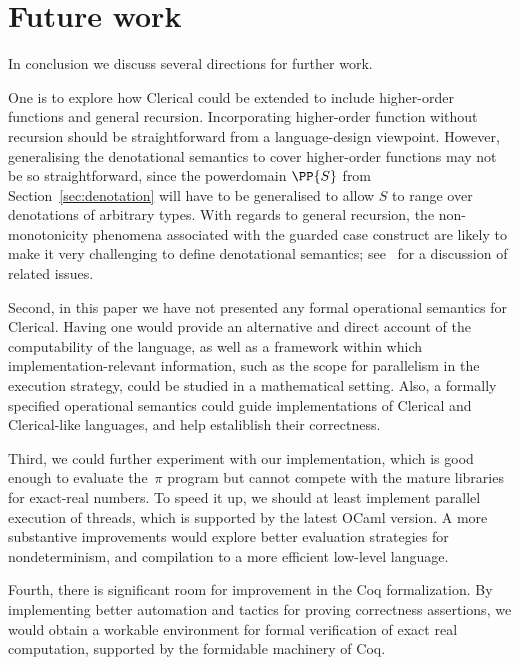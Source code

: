 \section{Future work}
\label{sec:future-work}

In conclusion we discuss several directions for further work.

One is to explore how Clerical could be extended to include higher-order functions and general recursion.
%
Incorporating higher-order function without recursion should be straightforward from a language-design viewpoint. However, generalising the denotational semantics to cover higher-order functions may not be so straightforward, since the powerdomain $\PP{S}$ from 
Section~\ref{sec:denotation} will have to be generalised to allow $S$ to range over denotations of arbitrary types. 
%
With regards to general recursion, the non-monotonicity phenomena associated with the guarded case construct are likely to make it very challenging to define denotational semantics; see~\cite{LEVY2007221} for a discussion of related issues.

Second, in this paper we have not presented any formal operational semantics for Clerical.
Having one would provide an alternative and direct
account of the computability of the language, as well as a
framework within which implementation-relevant information, such as
the scope for parallelism in the execution strategy, could be studied in a mathematical setting. Also, a formally specified operational semantics
could guide implementations of Clerical and Clerical-like languages, and help estaliblish their correctness.

Third, we could further experiment with our implementation, which is good enough to evaluate the~$\pi$ program but cannot compete with the mature libraries for exact-real numbers.
%
To speed it up, we should at least implement parallel execution of threads, which is supported by the latest OCaml version.
%
A more substantive improvements would explore better evaluation strategies for nondeterminism, and compilation to a more efficient low-level language.

Fourth, there is significant room for improvement in the Coq formalization. By implementing better automation and tactics for proving correctness assertions, we would obtain a workable environment for formal verification of exact real computation, supported by the formidable machinery of Coq.